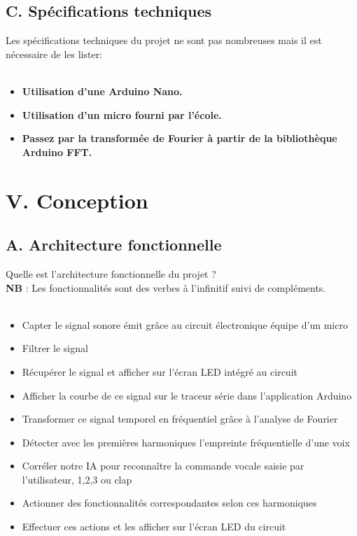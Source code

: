 \documentclass[a4paper,11pt]{book}
\begin{document}
\subsection*{C. Spécifications techniques}
Les spécifications techniques du projet ne sont pas nombreuses mais il est nécessaire de les lister: \\ \\
\begin{itemize}
        \item \textbf{Utilisation d'une Arduino Nano.}
        \item \textbf{Utilisation d'un micro fourni par l'école.}
        \item \textbf{Passez par la transformée de Fourier à partir de la bibliothèque Arduino FFT.} 
\end{itemize}
\vspace{2mm}

\newpage
\section*{V. Conception}
\subsection*{A. Architecture fonctionnelle}
Quelle est l’architecture fonctionnelle du projet ? \\
\noindent \textbf{NB} : Les fonctionnalités sont des verbes à l’infinitif suivi de compléments.\\ \\
\begin{itemize}
        \item Capter le signal sonore émit grâce au circuit électronique équipe d'un micro
\indent \item Filtrer le signal
\indent \item Récupérer le signal et afficher sur l'écran LED intégré au circuit 
\indent \item Afficher la courbe de ce signal sur le traceur série dans l'application Arduino 
\indent \item Transformer ce signal temporel en fréquentiel grâce à l'analyse de Fourier 
\indent \item Détecter avec les premières harmoniques l'empreinte fréquentielle d'une voix
\indent \item Corréler notre IA pour reconnaître la commande vocale saisie par l'utilisateur, 1,2,3 ou clap 
\indent \item Actionner des fonctionnalités correspondantes selon ces harmoniques 
\indent \item Effectuer ces actions et les afficher sur l'écran LED du circuit 
\end{itemize}
\end{document}
